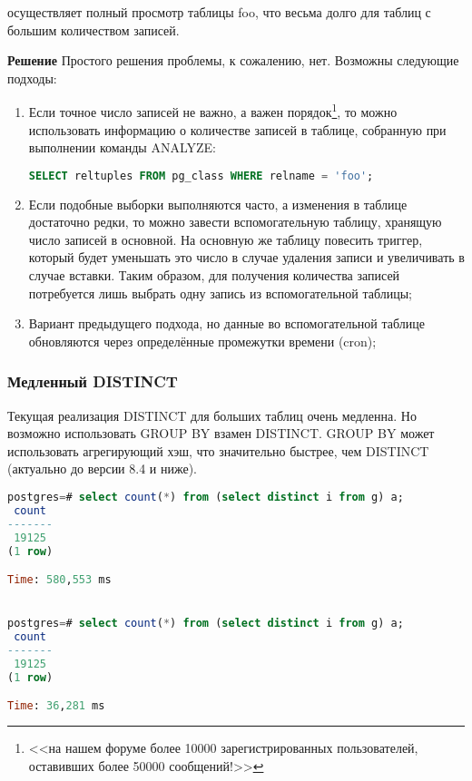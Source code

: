 осуществляет полный просмотр таблицы foo, что весьма долго для таблиц с большим количеством записей.

\textbf{Решение} Простого решения проблемы, к сожалению, нет. Возможны следующие подходы:

\begin{enumerate}
  \item Если точное число записей не важно, а важен порядок\footnote{<<на нашем форуме более 10000 зарегистрированных пользователей, оставивших более 50000 сообщений!>>}, то можно использовать информацию о количестве записей в таблице, собранную при выполнении команды ANALYZE:
  \begin{lstlisting}[language=SQL,label=lst:sql_performance2,caption=SQL]
  SELECT reltuples FROM pg_class WHERE relname = 'foo';
  \end{lstlisting}
  \item Если подобные выборки выполняются часто, а изменения в таблице достаточно редки, то можно завести вспомогательную таблицу, хранящую число записей в основной. На основную же таблицу повесить триггер, который будет уменьшать это число в случае удаления записи и увеличивать в случае вставки. Таким образом, для получения количества записей потребуется лишь выбрать одну запись из вспомогательной таблицы;
  \item Вариант предыдущего подхода, но данные во вспомогательной таблице обновляются через определённые промежутки времени (cron);
\end{enumerate}


\subsubsection{Медленный DISTINCT}

Текущая реализация DISTINCT для больших таблиц очень медленна. Но возможно использовать GROUP BY взамен DISTINCT. GROUP BY может использовать агрегирующий хэш, что значительно быстрее, чем DISTINCT (актуально до версии 8.4 и ниже).

\begin{lstlisting}[language=SQL,label=lst:sql_performance3,caption=DISTINCT]
postgres=# select count(*) from (select distinct i from g) a;
 count
-------
 19125
(1 row)

Time: 580,553 ms


postgres=# select count(*) from (select distinct i from g) a;
 count
-------
 19125
(1 row)

Time: 36,281 ms
\end{lstlisting}

